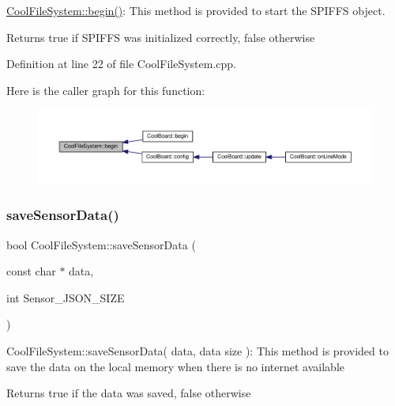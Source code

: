 \hyperlink{class_cool_file_system_a6ba6f666ed4c530174f8569d2c636748}{Cool\+File\+System\+::begin()}\+: This method is provided to start the S\+P\+I\+F\+FS object.

\begin{DoxyReturn}{Returns}
true if S\+P\+I\+F\+FS was initialized correctly, false otherwise 
\end{DoxyReturn}


Definition at line 22 of file Cool\+File\+System.\+cpp.

Here is the caller graph for this function\+:\nopagebreak
\begin{figure}[H]
\begin{center}
\leavevmode
\includegraphics[width=350pt]{class_cool_file_system_a6ba6f666ed4c530174f8569d2c636748_icgraph}
\end{center}
\end{figure}
\mbox{\label{class_cool_file_system_a4c560c2ddd40b74b7758e6ceb2c58957}} 
\subsubsection{\texorpdfstring{save\+Sensor\+Data()}{saveSensorData()}}
{\footnotesize\ttfamily bool Cool\+File\+System\+::save\+Sensor\+Data (\begin{DoxyParamCaption}\item[{const char $\ast$}]{data,  }\item[{int}]{Sensor\+\_\+\+J\+S\+O\+N\+\_\+\+S\+I\+ZE }\end{DoxyParamCaption})}

Cool\+File\+System\+::save\+Sensor\+Data( data, data size )\+: This method is provided to save the data on the local memory when there is no internet available

\begin{DoxyReturn}{Returns}
true if the data was saved, false otherwise 
\end{DoxyReturn}


